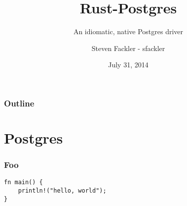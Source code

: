 \documentclass{beamer}
\title{Rust-Postgres}
\subtitle{An idiomatic, native Postgres driver}
\author[sfackler]{Steven Fackler - sfackler}
\date{July 31, 2014}
\begin{document}
\begin{frame}
\titlepage
\end{frame}

\begin{frame}
    \frametitle{Outline}
    \tableofcontents
\end{frame}

\section{Postgres}

\begin{frame}[fragile]
    \frametitle{Foo}
    \begin{verbatim}
fn main() {
    println!("hello, world");
}
    \end{verbatim}
\end{frame}
\end{document}
